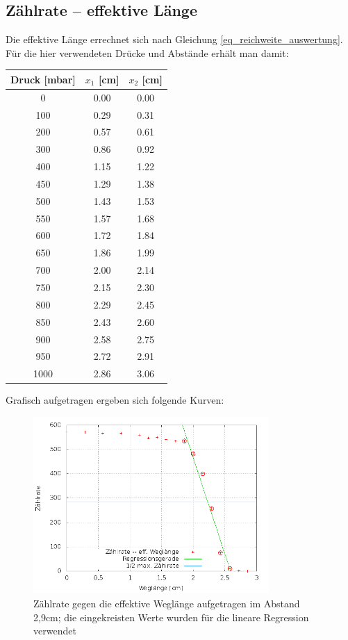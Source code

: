 \subsection{Zählrate -- effektive Länge}
Die effektive Länge errechnet sich nach Gleichung \eqref{eq_reichweite_auswertung}. Für die hier verwendeten Drücke und Abstände erhält man damit:
\begin{table}[H]
\begin{tabular}{|c|c|c|}
Druck [mbar]	& $x_1$ [cm]	& $x_2$ [cm]\\ \hline
0					&0.00	&0.00\\ \hline
100					&0.29	&0.31\\ \hline
200					&0.57	&0.61\\ \hline
300					&0.86	&0.92\\ \hline
400					&1.15	&1.22\\ \hline
450					&1.29	&1.38\\ \hline
500					&1.43	&1.53\\ \hline
550					&1.57	&1.68\\ \hline
600					&1.72	&1.84\\ \hline
650					&1.86	&1.99\\ \hline
700					&2.00	&2.14\\ \hline
750					&2.15	&2.30\\ \hline
800					&2.29	&2.45\\ \hline
850					&2.43	&2.60\\ \hline
900					&2.58	&2.75\\ \hline
950					&2.72	&2.91\\ \hline
1000				&2.86	&3.06\\ \hline 
\end{tabular} 
\end{table}

Grafisch aufgetragen ergeben sich folgende Kurven:
\begin{figure}[H]
\includegraphics[width=0.8\textwidth]{pics/zaehlrate_weglaenge.png}
\caption{Zählrate gegen die effektive Weglänge aufgetragen im Abstand 2,9cm; die eingekreisten Werte wurden für die lineare Regression verwendet}
\label{pic_zw1}
\end{figure}

